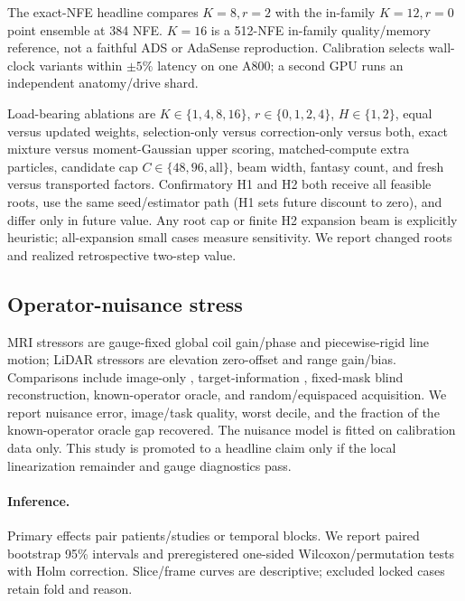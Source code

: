 The exact-NFE headline compares \method{} $K=8,r=2$ with the in-family
$K=12,r=0$ point ensemble at 384 NFE.  $K=16$ is a 512-NFE in-family
quality/memory reference, not a faithful ADS or AdaSense reproduction.
Calibration selects wall-clock variants within $\pm5\%$ latency on one A800;
a second GPU runs an independent anatomy/drive shard.

Load-bearing ablations are $K\in\{1,4,8,16\}$,
$r\in\{0,1,2,4\}$, $H\in\{1,2\}$, equal versus updated weights,
selection-only versus correction-only versus both, exact mixture versus
moment-Gaussian upper scoring, matched-compute extra particles, candidate cap
$C\in\{48,96,\text{all}\}$, beam width, fantasy count, and fresh versus
transported factors.  Confirmatory H1 and H2 both receive all feasible roots,
use the same seed/estimator path (H1 sets future discount to zero), and differ
only in future value.  Any root cap or finite H2 expansion beam is explicitly
heuristic; all-expansion small cases measure sensitivity.  We report changed
roots and realized retrospective two-step value.

\subsection{Operator-nuisance stress}

MRI stressors are gauge-fixed global coil gain/phase and piecewise-rigid line
motion; LiDAR stressors are elevation zero-offset and range gain/bias.
Comparisons include image-only \method{}, target-information \method{},
fixed-mask blind reconstruction, known-operator oracle, and random/equispaced
acquisition.  We report nuisance error, image/task quality, worst decile, and
the fraction of the known-operator oracle gap recovered.  The nuisance model
is fitted on calibration data only.  This study is promoted to a headline
claim only if the local linearization remainder and gauge diagnostics pass.

\paragraph{Inference.}
Primary effects pair patients/studies or temporal blocks.  We report paired
bootstrap 95\% intervals and preregistered one-sided Wilcoxon/permutation
tests with Holm correction.  Slice/frame curves are descriptive; excluded
locked cases retain fold and reason.

